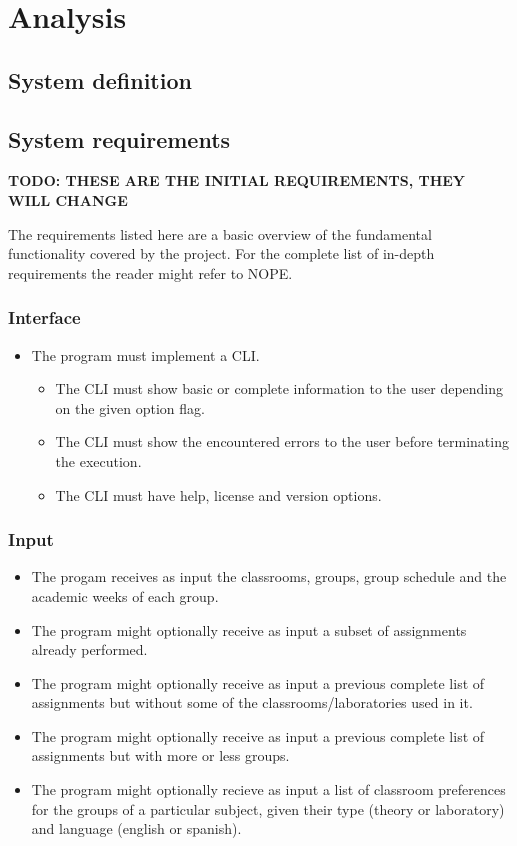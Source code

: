\renewcommand{\documentname}{Analysis}

\chapter{Analysis}


\section{System definition}


\section{System requirements}

\textbf{TODO: THESE ARE THE INITIAL REQUIREMENTS, THEY WILL CHANGE}

The requirements listed here are a basic overview of the fundamental functionality covered by the project. For the complete list of in-depth requirements the reader might refer to NOPE.

\subsection{Interface}

\begin{itemize}
    \item The program must implement a CLI.
        \begin{itemize}
            \item The CLI must show basic or complete information to the user depending on the given option flag.
            \item The CLI must show the encountered errors to the user before terminating the execution.
            \item The CLI must have help, license and version options.
        \end{itemize}
\end{itemize}

\subsection{Input}

\begin{itemize}
    \item The progam receives as input the classrooms, groups, group schedule and the academic weeks of each group.
    \item The program might optionally receive as input a subset of assignments already performed.
    \item The program might optionally receive as input a previous complete list of assignments but without some of the classrooms/laboratories used in it.
    \item The program might optionally receive as input a previous complete list of assignments but with more or less groups.
    \item The program might optionally recieve as input a list of classroom preferences for the groups of a particular subject, given their type (theory or laboratory) and language (english or spanish).
\end{itemize}


